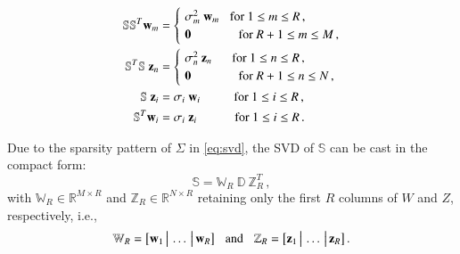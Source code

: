 \documentclass{elsarticle}
\theoremstyle{theorem}
\theoremstyle{definition}
\theoremstyle{remark}
\theoremstyle{proposition}
\numberwithin{figure}{section}
\begin{document}
		\begin{align}
			\label{eq:left-singular-vectors}
			\mathbb{S} \mathbb{S}^T \mathbf{w}_m & = 
			\begin{cases}
				& \hspace*{-0.3cm} \sigma_m^2 ~ \mathbf{w}_m \hspace*{0.3cm} \text{for $1 \leq m \leq R$} \, , \\
				& \hspace*{-0.3cm} \mathbf{0} \hspace*{1.34cm} \text{for $R+1 \leq m \leq M$} \, ,
			\end{cases} \\
			\label{eq:right-singular-vectors}
			\mathbb{S}^T \mathbb{S} ~ \mathbf{z}_n & =
			\begin{cases}
				& \hspace*{-0.3cm} \sigma_n^2 ~ \mathbf{z}_n \hspace*{0.57cm} \text{for $1 \leq n \leq R$} \, , \\
				& \hspace*{-0.3cm} \mathbf{0} \hspace*{1.34cm} \text{for $R+1 \leq n \leq N$} \, ,
			\end{cases} \\
			\label{eq:snapshot-method}
			\mathbb{S} ~ \mathbf{z}_i & = \sigma_i ~ \mathbf{w}_i \hspace*{0.95cm} \text{for $1 \leq i \leq R$} \, , \\
			\mathbb{S}^T \mathbf{w}_i & = \sigma_i ~ \mathbf{z}_i \hspace*{1.07cm} \text{for $1 \leq i \leq R$} \, .
		\end{align}
		
		
		\noindent Due to the sparsity pattern of $\Sigma$ in \eqref{eq:svd}, the SVD of $\mathbb{S}$ can be cast in the compact form:
		\begin{equation*}
			\label{eq:svd-compact}
			\mathbb{S} = \mathbb{W}_R^{} ~ \mathbb{D} ~ \mathbb{Z}_R^T \, ,
		\end{equation*}
		with $\mathbb{W}_R \in \mathbb{R}^{M \times R}$ and $\mathbb{Z}_R \in \mathbb{R}^{N \times R}$ retaining only the first $R$ columns of $W$ and $Z$, respectively, i.e.,
		\begin{equation}
			\label{eq:svd-compact-matrices}
			\mathbb{W}_R = \big[ \mathbf{w}_1 \, \big| \, \ldots \, \big| \, \mathbf{w}_R \big] \hspace*{0.3cm} \text{and} \hspace*{0.3cm} \mathbb{Z}_R = \big[ \mathbf{z}_1 \, \big| \, \ldots \, \big| \, \mathbf{z}_R \big] \, .
		\end{equation}
		
\end{document}
